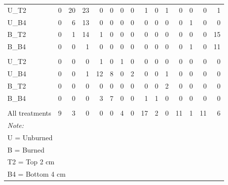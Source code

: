 \documentclass[
  11pt,
]{article}
\begin{document}
\begin{table}[!h]
{\begin{tabular}[t]{lrrrrrrrrrrrrrr}
\hspace{1em}U\_T2 & 0 & 20 & 23 & 0 & 0 & 0 & 0 & 1 & 0 & 1 & 0 & 0 & 0 & 1\\
\hspace{1em}U\_B4 & 0 & 6 & 13 & 0 & 0 & 0 & 0 & 0 & 0 & 0 & 0 & 1 & 0 & 0\\
\hspace{1em}B\_T2 & 0 & 1 & 14 & 1 & 0 & 0 & 0 & 0 & 0 & 0 & 0 & 0 & 0 & 15\\
\hspace{1em}B\_B4 & 0 & 0 & 1 & 0 & 0 & 0 & 0 & 0 & 0 & 0 & 0 & 1 & 0 & 11\\
\addlinespace[0.3em]
\multicolumn{15}{l}{\textit{\textbf{M. gracilis}}}\\
\hspace{1em}U\_T2 & 0 & 0 & 0 & 1 & 0 & 1 & 0 & 0 & 0 & 0 & 0 & 0 & 0 & 0\\
\hspace{1em}U\_B4 & 0 & 0 & 1 & 12 & 8 & 0 & 2 & 0 & 0 & 1 & 0 & 0 & 0 & 0\\
\hspace{1em}B\_T2 & 0 & 0 & 0 & 0 & 0 & 0 & 0 & 0 & 0 & 2 & 0 & 0 & 0 & 0\\
\hspace{1em}B\_B4 & 0 & 0 & 0 & 3 & 7 & 0 & 0 & 1 & 1 & 0 & 0 & 0 & 0 & 0\\
\addlinespace[0.3em]
\multicolumn{15}{l}{\textbf{Other species}}\\
\hspace{1em}All treatments & 9 & 3 & 0 & 0 & 0 & 4 & 0 & 17 & 2 & 0 & 11 & 1 & 11 & 6\\
\bottomrule
\multicolumn{15}{l}{\rule{0pt}{1em}\textit{Note: }}\\
\multicolumn{15}{l}{\rule{0pt}{1em}U = Unburned}\\
\multicolumn{15}{l}{\rule{0pt}{1em}B = Burned}\\
\multicolumn{15}{l}{\rule{0pt}{1em}T2 = Top 2 cm}\\
\multicolumn{15}{l}{\rule{0pt}{1em}B4 = Bottom 4 cm}\\
\end{tabular}}
\end{table}
\end{document}
